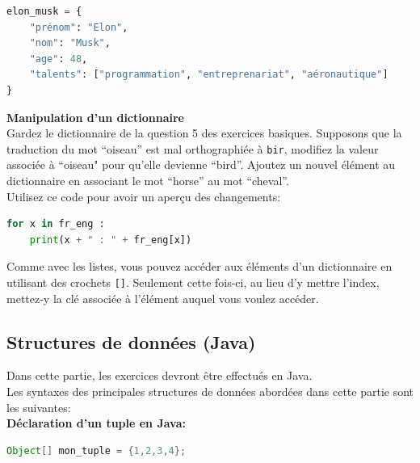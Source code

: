	 \begin{lstlisting}[language=Python]
elon_musk = {
    "prénom": "Elon",
    "nom": "Musk",
    "age": 48,
    "talents": ["programmation", "entreprenariat", "aéronautique"]
}   \end{lstlisting}
		
    \begin{Exercice}[10 minutes] \textbf{Manipulation d'un dictionnaire}\\
       Gardez le dictionnaire de la question 5 des exercices basiques. Supposons que la traduction du mot ``oiseau'' est mal orthographiée à \texttt{bir}, modifiez la valeur associée à ``oiseau" pour qu'elle devienne ``bird''. Ajoutez un nouvel élément au dictionnaire en associant le mot ``horse'' au mot ``cheval''. \\
       
       Utilisez ce code pour avoir un aperçu des changements:
       
       \begin{lstlisting}[language=Python]
for x in fr_eng :
    print(x + " : " + fr_eng[x])   \end{lstlisting}
    
        \begin{conseil}
            Comme avec les listes, vous pouvez accéder aux éléments d'un dictionnaire en utilisant des crochets \lstinline{[]}. Seulement cette fois-ci, au lieu d'y mettre l'index, mettez-y la clé associée à l'élément auquel vous voulez accéder.
        \end{conseil}
        
        \begin{solution}
             
        \end{solution}
    \end{Exercice}
    
    
    \subsection{Structures de données (Java)}
    Dans cette partie, les exercices devront être effectués en Java. \\
    Les syntaxes des principales structures de données abordées dans cette partie sont les suivantes: \\
    \textbf{Déclaration d'un tuple en Java:}
     \begin{lstlisting}[language=Java]
              Object[] mon_tuple = {1,2,3,4}; \end{lstlisting} 
              
